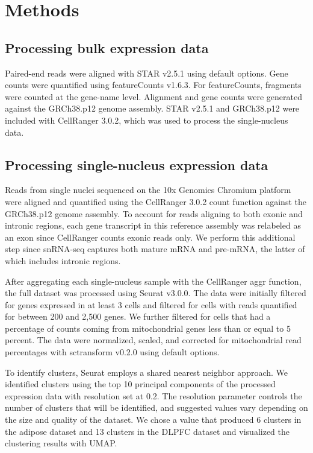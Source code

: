 \section{Methods}

\subsection{Processing bulk expression data}

Paired-end reads were aligned with STAR v2.5.1 using default options.  Gene counts were quantified using featureCounts v1.6.3. For featureCounts, fragments were counted at the gene-name level. Alignment and gene counts were generated against the GRCh38.p12 genome assembly. STAR v2.5.1 and GRCh38.p12 were included with CellRanger 3.0.2, which was used to process the single-nucleus data.

\subsection{Processing single-nucleus expression data}

Reads from single nuclei sequenced on the 10x Genomics Chromium platform were aligned and quantified using the CellRanger 3.0.2 count function against the GRCh38.p12 genome assembly. To account for reads aligning to both exonic and intronic regions, each gene transcript in this reference assembly was relabeled as an exon since CellRanger counts exonic reads only. We perform this additional step since snRNA-seq captures both mature mRNA and pre-mRNA, the latter of which includes intronic regions. 

After aggregating each single-nucleus sample with the CellRanger aggr function, the full dataset was processed using Seurat v3.0.0\cite{butler2018-mj}. The data were initially filtered for genes expressed in at least 3 cells and filtered for cells with reads quantified for between 200 and 2,500 genes. We further filtered for cells that had a percentage of counts coming from mitochondrial genes less than or equal to 5 percent. The data were normalized, scaled, and corrected for mitochondrial read percentages with sctransform v0.2.0\cite{Hafemeister_undated-xh} using default options.

To identify clusters, Seurat employs a shared nearest neighbor approach. We identified clusters using the top 10 principal components of the processed expression data with resolution set at 0.2. The resolution parameter controls the number of clusters that will be identified, and suggested values vary depending on the size and quality of the dataset. We chose a value that produced 6 clusters in the adipose dataset and 13 clusters in the DLPFC dataset and visualized the clustering results with UMAP\cite{McInnes2018-lp}. 

